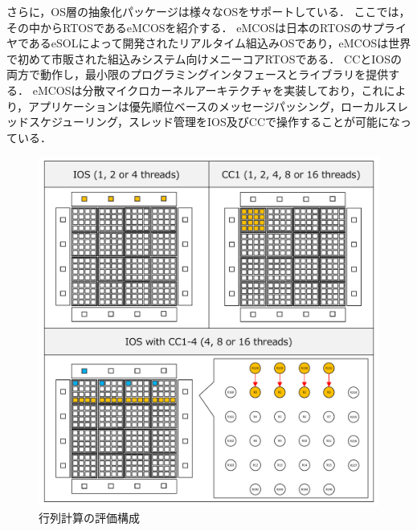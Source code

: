 \documentclass[submit,techrep]{ipsj_v2/UTF8/ipsj}
\begin{document}
さらに，OS層の抽象化パッケージは様々なOSをサポートしている．
ここでは，その中からRTOSであるeMCOSを紹介する．
eMCOSは日本のRTOSのサプライヤであるeSOLによって開発されたリアルタイム組込みOSであり，eMCOSは世界で初めて市販された組込みシステム向けメニーコアRTOSである．
CCとIOSの両方で動作し，最小限のプログラミングインタフェースとライブラリを提供する．
eMCOSは分散マイクロカーネルアーキテクチャを実装しており，これにより，アプリケーションは優先順位ベースのメッセージパッシング，ローカルスレッドスケジューリング，スレッド管理をIOS及びCCで操作することが可能になっている．




\begin{figure}[t]
  \centering
  \includegraphics[width=0.8\linewidth]{../figure/matrix_calculation.pdf}
  \caption{\label{fig:mat_calc}
    行列計算の評価構成}
\end{figure}
\end{document}
